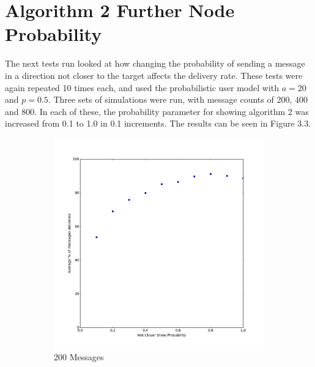 \documentclass[bsc,frontabs,twoside,singlespacing,parskip,deptreport]{infthesis}     %
\begin{document}
\section{Algorithm 2 Further Node Probability}
The next tests run looked at how changing the probability of sending a message in a direction not closer to the target affects the delivery rate. These tests were again repeated 10 times each, and used the probabilistic user model with $a = 20$ and $p = 0.5$. Three sets of simulations were run, with message counts of 200, 400 and 800. In each of these, the probability parameter for showing algorithm 2 was increased from 0.1 to 1.0 in 0.1 increments. The results can be seen in Figure 3.3.

\begin{figure}[h]
  	\vspace{-10pt}
    \centering
    \begin{subfigure}[b]{0.3\textwidth}
        \includegraphics[width=\textwidth]{results/notCloserProb_200messages}
        \caption{200 Messages}
        \label{fig:results/notCloserProb_200messages}
    \end{subfigure}
    ~ %
    \begin{subfigure}[b]{0.3\textwidth}

\end{subfigure}
\end{figure}
\end{document}
